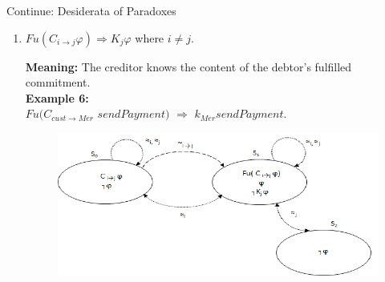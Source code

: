 \documentclass{beamer}
\begin{document}
 \begin{frame}{Continue: Desiderata of Paradoxes}
 \begin{enumerate}

\vspace{0.2cm} \item [P6.][\textbf{Knowing the content of the
other's fulfilled commitment}]

$Fu (C _{i\rightarrow j} \varphi) \Rightarrow K_j \varphi$ where
$i \neq j$.

\textbf{Meaning:} The creditor knows the content of the debtor's
fulfilled commitment.\\
\textbf{Example 6:}\\
$ Fu (C_{cust \rightarrow Mer}$ $sendPayment)$ $\Rightarrow $ $k_{Mer} sendPayment$.
	\begin{figure}[htbp]
\begin{center}
\includegraphics[width=.70 \columnwidth]{figures/figure4.png}
\end{center}
\end{figure}
\end{enumerate}
\end{frame}
\end{document}
